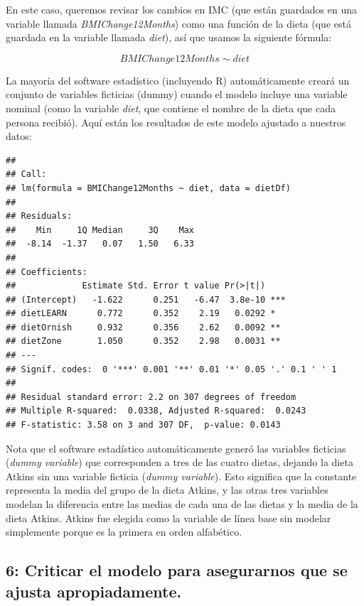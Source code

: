 \documentclass[
  12pt,
]{book}
\begin{document}
En este caso, queremos revisar los cambios en IMC (que están guardados en una variable llamada \emph{BMIChange12Months}) como una función de la dieta (que está guardada en la variable llamada \emph{diet}), así que usamos la siguiente fórmula:

\[
BMIChange12Months \sim diet
\]

La mayoría del software estadístico (incluyendo R) automáticamente creará un conjunto de variables ficticias (dummy) cuando el modelo incluye una variable nominal (como la variable \emph{diet}, que contiene el nombre de la dieta que cada persona recibió). Aquí están los resultados de este modelo ajustado a nuestros datos:

\begin{verbatim}
## 
## Call:
## lm(formula = BMIChange12Months ~ diet, data = dietDf)
## 
## Residuals:
##    Min     1Q Median     3Q    Max 
##  -8.14  -1.37   0.07   1.50   6.33 
## 
## Coefficients:
##             Estimate Std. Error t value Pr(>|t|)    
## (Intercept)   -1.622      0.251   -6.47  3.8e-10 ***
## dietLEARN      0.772      0.352    2.19   0.0292 *  
## dietOrnish     0.932      0.356    2.62   0.0092 ** 
## dietZone       1.050      0.352    2.98   0.0031 ** 
## ---
## Signif. codes:  0 '***' 0.001 '**' 0.01 '*' 0.05 '.' 0.1 ' ' 1
## 
## Residual standard error: 2.2 on 307 degrees of freedom
## Multiple R-squared:  0.0338, Adjusted R-squared:  0.0243 
## F-statistic: 3.58 on 3 and 307 DF,  p-value: 0.0143
\end{verbatim}

Nota que el software estadístico automáticamente generó las variables ficticias (\emph{dummy variable}) que corresponden a tres de las cuatro dietas, dejando la dieta Atkins sin una variable ficticia (\emph{dummy variable}). Esto significa que la constante representa la media del grupo de la dieta Atkins, y las otras tres variables modelan la diferencia entre las medias de cada una de las dietas y la media de la dieta Atkins. Atkins fue elegida como la variable de línea base sin modelar simplemente porque es la primera en orden alfabético.

\hypertarget{criticar-el-modelo-para-asegurarnos-que-se-ajusta-apropiadamente.}{%
\subsection{6: Criticar el modelo para asegurarnos que se ajusta apropiadamente.}\label{criticar-el-modelo-para-asegurarnos-que-se-ajusta-apropiadamente.}}
\end{document}
